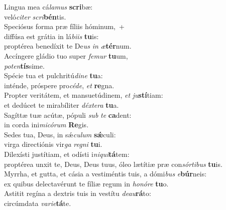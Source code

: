 \evenverse Lingua mea cá\textit{la}\textit{mus} \textbf{scri}bæ:~\*\\
\evenverse veló\textit{ci}\textit{ter} \textit{scri}\textbf{bén}tis.\\
\oddverse Speciósus forma præ fíliis hóminum,~+\\
\oddverse  diffúsa est grátia in lá\textit{bi}\textit{is} \textbf{tu}is:~\*\\
\oddverse proptérea benedíxit te De\textit{us} \textit{in} \textit{æ}\textbf{tér}num.\\
\evenverse Accíngere gládio tuo super \textit{fe}\textit{mur} \textbf{tu}um,~\*\\
\evenverse \textit{po}\textit{ten}\textbf{tís}sime.\\
\oddverse Spécie tua et pulchritú\textit{di}\textit{ne} \textbf{tu}a:~\*\\
\oddverse inténde, próspere pro\textit{cé}\textit{de}, \textit{et} \textbf{re}gna.\\
\evenverse Propter veritátem, et mansuetúdinem, \textit{et} \textit{ju}\textbf{stí}tiam:~\*\\
\evenverse et dedúcet te mirabíliter \textit{déx}\textit{te}\textit{ra} \textbf{tu}a.\\
\oddverse Sagíttæ tuæ acútæ, pópuli \textit{sub} \textit{te} \textbf{ca}dent:~\*\\
\oddverse in corda ini\textit{mi}\textit{có}\textit{rum} \textbf{Re}gis.\\
\evenverse Sedes tua, Deus, in sǽ\textit{cu}\textit{lum} \textbf{sǽ}culi:~\*\\
\evenverse virga directiónis vir\textit{ga} \textit{re}\textit{gni} \textbf{tu}i.\\
\oddverse Dilexísti justítiam, et odísti i\textit{ni}\textit{qui}\textbf{tá}tem:~\*\\
\oddverse proptérea unxit te, Deus, Deus tuus, óleo lætítiæ præ con\textit{sór}\textit{ti}\textit{bus} \textbf{tu}is.\\
\evenverse Myrrha, et gutta, et cásia a vestiméntis tuis, a dómi\textit{bus} \textit{e}\textbf{búr}neis:~\*\\
\evenverse ex quibus delectavérunt te fíliæ regum in \textit{ho}\textit{nó}\textit{re} \textbf{tu}o.\\
\oddverse Astitit regína a dextris tuis in vestítu \textit{de}\textit{au}\textbf{rá}to:~\*\\
\oddverse circúmdata \textit{va}\textit{ri}\textit{e}\textbf{tá}te.\\
